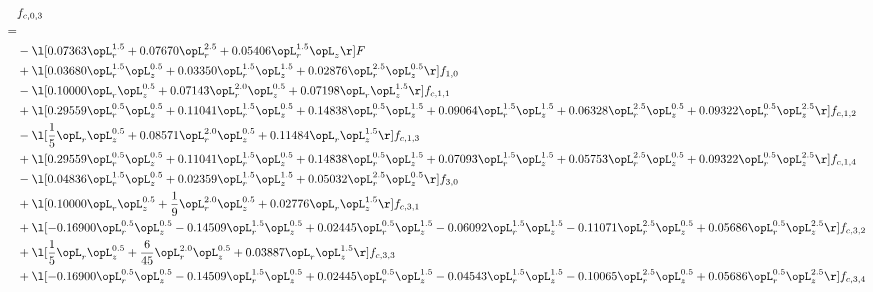 \begin{alignat}{2} 
\label{eq:f_03_2} 
& f_{c,0,3} \nonumber \\ 
 = \\ 
& - \l[  0.07363 \opL_r^{1.5} +  0.07670 \opL_r^{2.5} +  0.05406 \opL_r^{1.5} \opL_z  \r] F \nonumber \\ 
& + \l[  0.03680 \opL_r^{1.5} \opL_z^{0.5} +  0.03350 \opL_r^{1.5} \opL_z^{1.5} +  0.02876 \opL_r^{2.5} \opL_z^{0.5}  \r] f_{1,0} \nonumber \\ 
& - \l[  0.10000 \opL_r \opL_z^{0.5} +  0.07143 \opL_r^{2.0} \opL_z^{0.5} +  0.07198 \opL_r \opL_z^{1.5}  \r] f_{c,1,1} \nonumber \\ 
& + \l[  0.29559 \opL_r^{0.5} \opL_z^{0.5} +  0.11041 \opL_r^{1.5} \opL_z^{0.5} +  0.14838 \opL_r^{0.5} \opL_z^{1.5} +  0.09064 \opL_r^{1.5} \opL_z^{1.5} +  0.06328 \opL_r^{2.5} \opL_z^{0.5} +  0.09322 \opL_r^{0.5} \opL_z^{2.5}  \r] f_{c,1,2} \nonumber \\ 
& - \l[ \frac{1}{5} \opL_r \opL_z^{0.5} +  0.08571 \opL_r^{2.0} \opL_z^{0.5} +  0.11484 \opL_r \opL_z^{1.5}  \r] f_{c,1,3} \nonumber \\ 
& + \l[  0.29559 \opL_r^{0.5} \opL_z^{0.5} +  0.11041 \opL_r^{1.5} \opL_z^{0.5} +  0.14838 \opL_r^{0.5} \opL_z^{1.5} +  0.07093 \opL_r^{1.5} \opL_z^{1.5} +  0.05753 \opL_r^{2.5} \opL_z^{0.5} +  0.09322 \opL_r^{0.5} \opL_z^{2.5}  \r] f_{c,1,4} \nonumber \\ 
& - \l[  0.04836 \opL_r^{1.5} \opL_z^{0.5} +  0.02359 \opL_r^{1.5} \opL_z^{1.5} +  0.05032 \opL_r^{2.5} \opL_z^{0.5}  \r] f_{3,0} \nonumber \\ 
& + \l[  0.10000 \opL_r \opL_z^{0.5} + \frac{1}{9} \opL_r^{2.0} \opL_z^{0.5} +  0.02776 \opL_r \opL_z^{1.5}  \r] f_{c,3,1} \nonumber \\ 
& + \l[  -0.16900 \opL_r^{0.5} \opL_z^{0.5}   -0.14509 \opL_r^{1.5} \opL_z^{0.5} +  0.02445 \opL_r^{0.5} \opL_z^{1.5}   -0.06092 \opL_r^{1.5} \opL_z^{1.5}   -0.11071 \opL_r^{2.5} \opL_z^{0.5} +  0.05686 \opL_r^{0.5} \opL_z^{2.5}  \r] f_{c,3,2} \nonumber \\ 
& + \l[ \frac{1}{5} \opL_r \opL_z^{0.5} + \frac{6}{45} \opL_r^{2.0} \opL_z^{0.5} +  0.03887 \opL_r \opL_z^{1.5}  \r] f_{c,3,3} \nonumber \\ 
& + \l[  -0.16900 \opL_r^{0.5} \opL_z^{0.5}   -0.14509 \opL_r^{1.5} \opL_z^{0.5} +  0.02445 \opL_r^{0.5} \opL_z^{1.5}   -0.04543 \opL_r^{1.5} \opL_z^{1.5}   -0.10065 \opL_r^{2.5} \opL_z^{0.5} +  0.05686 \opL_r^{0.5} \opL_z^{2.5}  \r] f_{c,3,4} \nonumber \\ 

\end{alignat}
